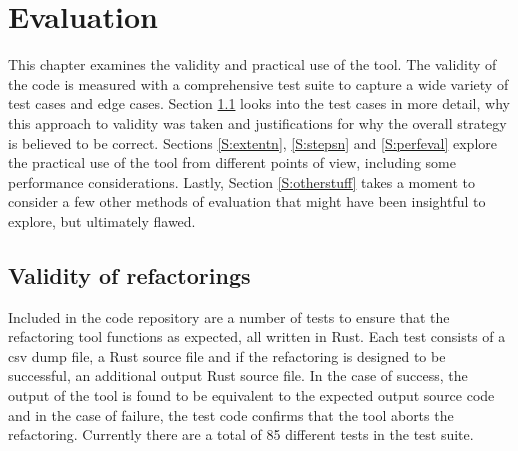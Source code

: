 \section{Evaluation}\label{C:eval}
This chapter examines the validity and practical use of the tool. The validity of the code is measured with a comprehensive test suite to capture a wide variety of test cases and edge cases. Section \ref{S:validity} looks into the test cases in more detail, why this approach to validity was taken and justifications for why the overall strategy is believed to be correct. Sections \ref{S:extentn}, \ref{S:stepsn} and \ref{S:perfeval} explore the practical use of the tool from different points of view, including some performance considerations. Lastly, Section \ref{S:otherstuff} takes a moment to consider a few other methods of evaluation that might have been insightful to explore, but ultimately flawed.

\subsection{Validity of refactorings}\label{S:validity}
Included in the code repository are a number of tests to ensure that the refactoring tool functions as expected, all written in Rust. Each test consists of a csv dump file, a Rust source file and if the refactoring is designed to be successful, an additional output Rust source file. In the case of success, the output of the tool is found to be equivalent to the expected output source code and in the case of failure, the test code confirms that the tool aborts the refactoring. Currently there are a total of 85 different tests in the test suite.






